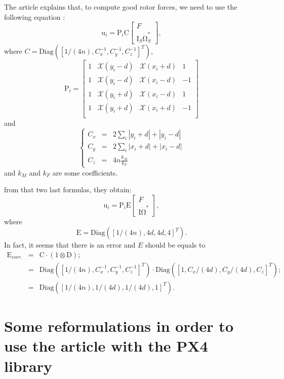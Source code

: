 \documentclass[a4paper]{article}
\newcommand{\UB}[1]{ \bm{\mathrm{#1}} }
\begin{document}
The article explains that, to compute good rotor forces, we need to use the following equation :
$$
\UB{u}_i
=
\UB{P}_i
\UB{C}
\left[
    \begin{array}{c}
        F \\
        \UB{I}_S \dot{\UB{\Omega}}_S^*
    \end{array}
\right],
$$
where $C = \mathrm{Diag}( [1/(4n), C_x^{-1}, C_y^{-1}, C_z^{-1}]^T )$,
$$
\UB{P}_i
=
\left[
\begin{array}{cccc}
1 & \mathcal{X}(y_{i} - d) & \mathcal{X}(x_{i} + d) &  1  \\
1 & \mathcal{X}(y_{i} - d) & \mathcal{X}(x_{i} - d) & -1  \\
1 & \mathcal{X}(y_{i} + d) & \mathcal{X}(x_{i} - d) &  1  \\
1 & \mathcal{X}(y_{i} + d) & \mathcal{X}(x_{i} + d) & -1  \\
\end{array}
\right]
$$
and
$$
\left\{
\begin{array}{rcl}
C_x & = & 2 \sum_i |y_i+d|+|y_i-d| \\
C_y & = & 2 \sum_i |x_i+d|+|x_i-d| \\
C_z & = & 4n \frac{k_M}{k_F}
\end{array}
\right.
$$
and $k_M$ and $k_F$ are some coefficients.

from that two last formulas, they obtain:
$$
\UB{u}_i
=
\UB{P}_i
\UB{E}
\left[
    \begin{array}{c}
        F \\
        \UB{I} \dot{\UB{\Omega}}^*
    \end{array}
\right],
$$
where 
$$
\UB{E} 
=
\mathrm{Diag}( [1/(4n), 4d, 4d, 4]^T ).
$$
In fact, it seems that there is an error and $E$ should be equals to
$$
\begin{array}{rcl}
\UB{E}_{corr.} & = & \UB{C} \cdot ( 1 \otimes \UB{D} );\\
       & = & \mathrm{Diag}( [1/(4n), C_x^{-1}, C_y^{-1}, C_z^{-1}]^T )
             \cdot
             \mathrm{Diag}( [1, C_x/(4d), C_y/(4d), C_z]^T ); \\
       & = & \mathrm{Diag}( [1/(4n), 1/(4d), 1/(4d), 1]^T ).
\end{array}
$$

\section{Some reformulations in order to use the article with the PX4 library}
\end{document}
